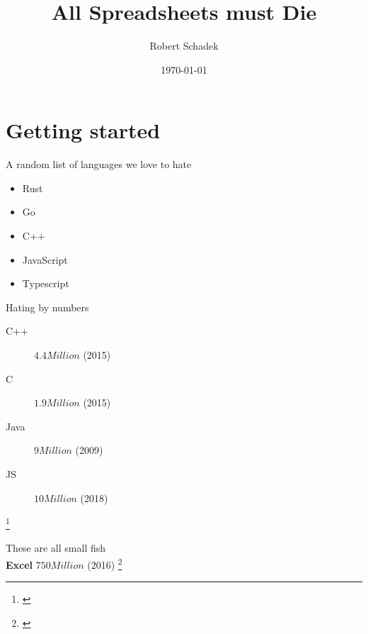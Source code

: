\documentclass[aspectratio=169,notes]{beamer}
\title{All Spreadsheets must Die}
\date{\today}
\author{Robert Schadek}
\begin{document}
	\maketitle

	\section{Getting started}
	\begin{frame}{A random list of languages we love to hate}
		\begin{itemize}
			\item Rust
			\item Go
			\item C++
			\item JavaScript
			\item Typescript
		\end{itemize}
	\end{frame}


	\begin{frame}{Hating by numbers}
		\begin{description}
			\item[C++] $4.4 Million$ (2015)
			\item[C] $1.9 Million$ (2015)
			\item[Java] $9 Million$ (2009)	
			\item[JS] $10 Million$ (2018)
		\end{description}
		\footnote{\cite{cdevs,Develope3:online}}
	\end{frame}
	
	\begin{frame}
		\begin{center}
		\huge
		These are all small fish\\[2cm]
		\pause
		\textbf{Excel} $750 Million$ (2016)
		\footnote{\cite{Build20153:online,Sevenrea2:online}}
		\end{center}
	\end{frame}
\end{document}
